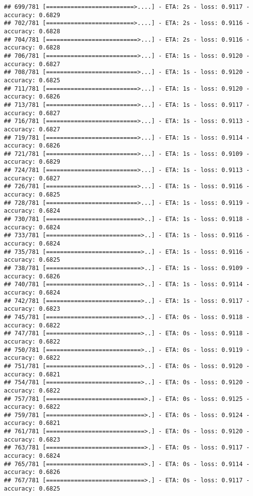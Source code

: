 \documentclass[
]{article}
\begin{document}
\begin{verbatim}
## 699/781 [=========================>....] - ETA: 2s - loss: 0.9117 - accuracy: 0.6829
## 702/781 [=========================>....] - ETA: 2s - loss: 0.9116 - accuracy: 0.6828
## 704/781 [==========================>...] - ETA: 2s - loss: 0.9116 - accuracy: 0.6828
## 706/781 [==========================>...] - ETA: 1s - loss: 0.9120 - accuracy: 0.6827
## 708/781 [==========================>...] - ETA: 1s - loss: 0.9120 - accuracy: 0.6825
## 711/781 [==========================>...] - ETA: 1s - loss: 0.9120 - accuracy: 0.6826
## 713/781 [==========================>...] - ETA: 1s - loss: 0.9117 - accuracy: 0.6827
## 716/781 [==========================>...] - ETA: 1s - loss: 0.9113 - accuracy: 0.6827
## 719/781 [==========================>...] - ETA: 1s - loss: 0.9114 - accuracy: 0.6826
## 721/781 [==========================>...] - ETA: 1s - loss: 0.9109 - accuracy: 0.6829
## 724/781 [==========================>...] - ETA: 1s - loss: 0.9113 - accuracy: 0.6827
## 726/781 [==========================>...] - ETA: 1s - loss: 0.9116 - accuracy: 0.6825
## 728/781 [==========================>...] - ETA: 1s - loss: 0.9119 - accuracy: 0.6824
## 730/781 [===========================>..] - ETA: 1s - loss: 0.9118 - accuracy: 0.6824
## 733/781 [===========================>..] - ETA: 1s - loss: 0.9116 - accuracy: 0.6824
## 735/781 [===========================>..] - ETA: 1s - loss: 0.9116 - accuracy: 0.6825
## 738/781 [===========================>..] - ETA: 1s - loss: 0.9109 - accuracy: 0.6826
## 740/781 [===========================>..] - ETA: 1s - loss: 0.9114 - accuracy: 0.6824
## 742/781 [===========================>..] - ETA: 1s - loss: 0.9117 - accuracy: 0.6823
## 745/781 [===========================>..] - ETA: 0s - loss: 0.9118 - accuracy: 0.6822
## 747/781 [===========================>..] - ETA: 0s - loss: 0.9118 - accuracy: 0.6822
## 750/781 [===========================>..] - ETA: 0s - loss: 0.9119 - accuracy: 0.6822
## 751/781 [===========================>..] - ETA: 0s - loss: 0.9120 - accuracy: 0.6821
## 754/781 [===========================>..] - ETA: 0s - loss: 0.9120 - accuracy: 0.6822
## 757/781 [============================>.] - ETA: 0s - loss: 0.9125 - accuracy: 0.6822
## 759/781 [============================>.] - ETA: 0s - loss: 0.9124 - accuracy: 0.6821
## 761/781 [============================>.] - ETA: 0s - loss: 0.9120 - accuracy: 0.6823
## 763/781 [============================>.] - ETA: 0s - loss: 0.9117 - accuracy: 0.6824
## 765/781 [============================>.] - ETA: 0s - loss: 0.9114 - accuracy: 0.6826
## 767/781 [============================>.] - ETA: 0s - loss: 0.9117 - accuracy: 0.6825

\end{verbatim}
\end{document}
